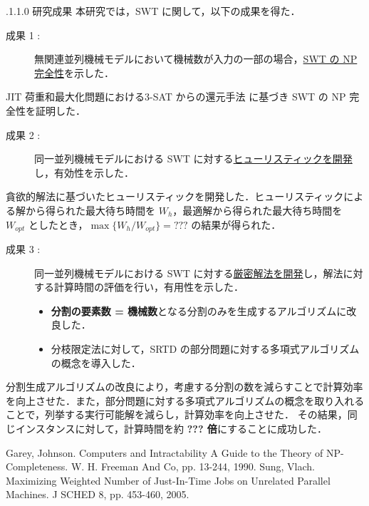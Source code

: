 \documentclass[oneside, 10pt, twocolumn]{jarticle}
\makeatletter
\def\section{\@startsection {section}{1}{\z@}{-3.5ex plus -1ex minus
-.2ex}{2.3 ex plus .2ex}{\large\bf}}
\renewcommand{\section}{
\@startsection{section}{1}{\z@}
{.1\Cvs \@plus.0\Cdp \@minus.1\Cdp}%
{.1\Cvs \@plus.1\Cdp \@minus.0\Cdp}%
{\reset@font\large\bfseries}}      %
\makeatother
\begin{document}
\section{研究成果}
本研究では，SWT に関して，以下の成果を得た．
\begin{description}
  \item[成果 1 : ]
  無関連並列機械モデルにおいて機械数が入力の一部の場合，\underline{SWT の NP 完全性}を示した．
\end{description}
JIT 荷重和最大化問題における\textsc{3-SAT} からの還元手法 \cite{SJIT} に基づき SWT の NP 完全性を証明した．

\begin{description}
  \item[成果 2 : ]
  同一並列機械モデルにおける SWT に対する\underline{ヒューリスティックを開発}し，有効性を示した．
\end{description}
貪欲的解法に基づいたヒューリスティックを開発した．ヒューリスティックによる解から得られた最大待ち時間を $W_h$，最適解から得られた最大待ち時間を $W_{opt}$ としたとき，\mbox{\boldmath $\max\big\{W_h/W_{opt}\big\} = ???$} の結果が得られた．

\begin{description}
  \item[成果 3 : ]
  同一並列機械モデルにおける SWT に対する\underline{厳密解法を開発}し，解法に対する計算時間の評価を行い，有用性を示した．
  \begin{itemize}
    \setlength{\leftskip}{-10mm}
    \item {\bf 分割の要素数 = 機械数}となる分割のみを生成するアルゴリズムに改良した．
    \item 分枝限定法に対して，SRTD の部分問題に対する多項式アルゴリズムの概念を導入した．
  \end{itemize}
\end{description}
分割生成アルゴリズムの改良により，考慮する分割の数を減らすことで計算効率を向上させた．また，部分問題に対する多項式アルゴリズムの概念を取り入れることで，列挙する実行可能解を減らし，計算効率を向上させた．
その結果，同じインスタンスに対して，計算時間を約 {\bf ??? 倍}にすることに成功した．

\begin{thebibliography}{9} %
  Garey, Johnson.
  Computers and Intractability A Guide to the Theory of NP-Completeness.
  W. H. Freeman And Co, pp. 13-244, 1990.
  Sung, Vlach.
  Maximizing Weighted Number of Just-In-Time Jobs on Unrelated Parallel Machines. J SCHED 8, pp. 453-460, 2005.
  \vspace{-2mm}
\end{thebibliography}
\end{document}
